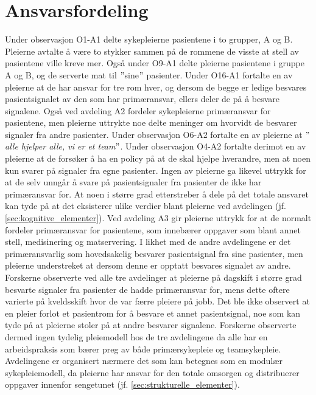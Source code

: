 \section{Ansvarsfordeling}
Under observasjon O1-A1 delte sykepleierne pasientene i to grupper, A og B. Pleierne avtalte å være to stykker sammen på de rommene de visste at stell av pasientene ville kreve mer. Også under O9-A1 delte pleierne pasientene i gruppe A og B, og de serverte mat til $"$sine$"$ pasienter. Under O16-A1 fortalte en av pleierne at de har ansvar for tre rom hver, og dersom de begge er ledige besvares pasientsignalet av den som har primæransvar, ellers deler de på å besvare signalene. Også ved avdeling A2 fordeler sykepleierne primæransvar for pasientene, men pleierne uttrykte noe delte meninger om hvorvidt de besvarer signaler fra andre pasienter. Under observasjon O6-A2 fortalte en av pleierne at \textit{$"$alle hjelper alle, vi er et team$"$}. Under observasjon O4-A2 fortalte derimot en av pleierne at de forsøker å ha en policy på at de skal hjelpe hverandre, men at noen kun svarer på signaler fra egne pasienter. Ingen av pleierne ga likevel uttrykk for at de selv unngår å svare på pasientsignaler fra pasienter de ikke har primæransvar for. At noen i større grad etterstreber å dele på det totale ansvaret kan tyde på at det eksisterer ulike verdier blant pleierne ved avdelingen (jf. \ref{sec:kognitive_elementer}). Ved avdeling A3 gir pleierne uttrykk for at de normalt fordeler primæransvar for pasientene, som innebærer oppgaver som blant annet stell, medisinering og matservering. I likhet med de andre avdelingene er det primæransvarlig som hovedsakelig besvarer pasientsignal fra sine pasienter, men pleierne understreket at dersom denne er opptatt besvares signalet av andre. Forskerne observerte ved alle tre avdelinger at pleierne på dagskift i større grad besvarte signaler fra pasienter de hadde primæransvar for, mens dette oftere varierte på kveldsskift hvor de var færre pleiere på jobb. Det ble ikke observert at en pleier forlot et pasientrom for å besvare et annet pasientsignal, noe som kan tyde på at pleierne stoler på at andre besvarer signalene. Forskerne observerte dermed ingen tydelig pleiemodell hos de tre avdelingene da alle har en arbeidspraksis som bærer preg av både primærsykepleie og teamsykepleie. Avdelingene er organisert nærmere det som kan betegnes som en modulær sykepleiemodell, da pleierne har ansvar for den totale omsorgen og distribuerer oppgaver innenfor sengetunet (jf. \ref{sec:strukturelle_elementer}). 

